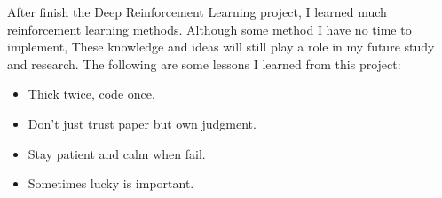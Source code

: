 \documentclass{article}
\begin{document}
After finish the Deep Reinforcement Learning project, I learned much reinforcement 
learning methods. Although some method I have no time to implement, These knowledge and ideas will still play a role in my future study and research. The following are some lessons I learned from this project:

\begin{itemize}
    \item Thick twice, code once.
    \item Don’t just trust paper but own judgment.
    \item Stay patient and calm when fail.
    \item Sometimes lucky is important.
\end{itemize}

\appendix

\nocite{2015arXiv151106581W}
\nocite{2017arXiv171002298H}
\nocite{2015arXiv150906461V}
\nocite{2013arXiv1312.5602M}
\nocite{2015arXiv151105952S}
\nocite{2017arXiv170706887B}
\nocite{2015Natur.518..529M}
\nocite{2016arXiv160602228M}
\nocite{2015arXiv150201852H}



\end{document}
